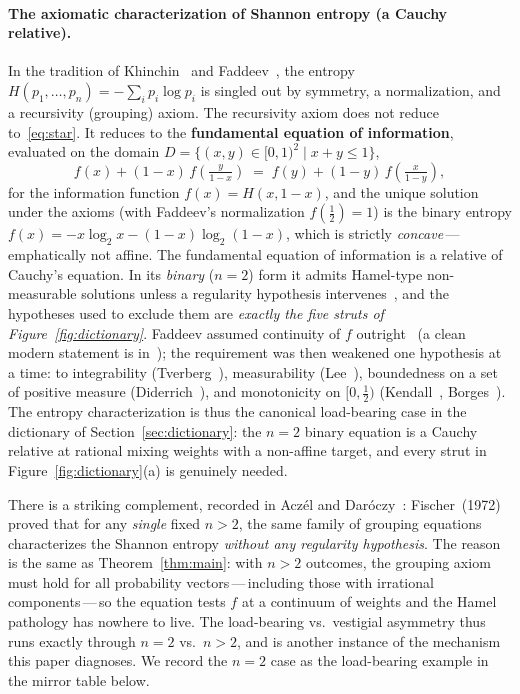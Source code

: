 \documentclass{article}
\theoremstyle{plain}
\theoremstyle{definition}
\begin{document}
\paragraph{The axiomatic characterization of Shannon entropy (a Cauchy relative).}
In the tradition of Khinchin~\cite{Khinchin1957} and
Faddeev~\cite{Faddeev1957}, the entropy
$H(p_1,\ldots,p_n)=-\sum_i p_i\log p_i$ is singled out by symmetry, a
normalization, and a recursivity (grouping) axiom. The recursivity
axiom does not reduce to~\eqref{eq:star}. It reduces to the
\textbf{fundamental equation of information}, evaluated on the domain $D = \{(x, y) \in [0, 1)^2 \mid x + y \le 1\}$,
\[
f(x)+(1-x)\,f\!\left(\tfrac{y}{1-x}\right)
\;=\;f(y)+(1-y)\,f\!\left(\tfrac{x}{1-y}\right),
\]
for the information function $f(x)=H(x,1-x)$, and the unique solution
under the axioms (with Faddeev's normalization $f(\tfrac12)=1$) is the
binary entropy $f(x)=-x\log_2 x-(1-x)\log_2(1-x)$, which is strictly
\emph{concave}\,---\,emphatically not affine. The fundamental
equation of information is a relative of Cauchy's equation. In its
\emph{binary} ($n=2$) form it admits Hamel-type non-measurable
solutions unless a regularity hypothesis intervenes~\cite{AczelDaroczy1975},
and the hypotheses used to exclude them are \emph{exactly the five
struts of Figure~\ref{fig:dictionary}}. Faddeev assumed continuity of
$f$ outright~\cite{Faddeev1957} (a clean modern statement is
in~\cite{BaezFritzLeinster2011}); the requirement was then weakened
one hypothesis at a time: to integrability (Tverberg~\cite{Tverberg1958}),
measurability (Lee~\cite{Lee1964}), boundedness on a set of positive
measure (Diderrich~\cite{Diderrich1975}), and monotonicity on
$[0,\tfrac{1}{2})$ (Kendall~\cite{Kendall1964}, Borges~\cite{Borges1967}).
The entropy characterization is thus the canonical load-bearing case
in the dictionary of Section~\ref{sec:dictionary}: the $n=2$ binary
equation is a Cauchy relative at rational mixing weights with a
non-affine target, and every strut in Figure~\ref{fig:dictionary}(a)
is genuinely needed.

There is a striking complement, recorded in Acz\'el and
Dar\'oczy~\cite{AczelDaroczy1975}: Fischer~(1972) proved that for any
\emph{single} fixed $n>2$, the same family of grouping equations
characterizes the Shannon entropy \emph{without any regularity
hypothesis}. The reason is the same as Theorem~\ref{thm:main}: with
$n>2$ outcomes, the grouping axiom must hold for all probability
vectors\,---\,including those with irrational components\,---\,so the
equation tests $f$ at a continuum of weights and the Hamel pathology
has nowhere to live. The load-bearing vs.\ vestigial asymmetry thus
runs exactly through $n=2$ vs.\ $n>2$, and is another
instance of the mechanism this paper diagnoses. We record the $n=2$
case as the load-bearing example in the mirror table below.
\end{document}
